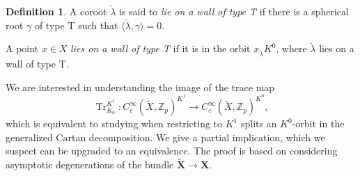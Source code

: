 \documentclass{amsart}
\theoremstyle{definition}
\newtheorem{definition}[theorem]{Definition}
\theoremstyle{remark}
\newcommand{\1}{\mathbf{1}}
\newcommand{\bra}{\langle}
\newcommand{\ket}{\rangle}
\newcommand{\mb}[1]{\mathbf{#1}}
\newcommand{\Z}{\mathbb{Z}}
\DeclareMathOperator{\Tr}{Tr}
\theoremstyle{definition}
\begin{document}
\begin{definition}
  A coroot $\check\lambda$ is said to \emph{lie on a wall of type T} if there is a spherical root $\gamma$ of type T such that $\bra\check{\lambda},\gamma\ket=0$.
  
  A point $x\in X$ \emph{lies on a wall of type T} if it is in the orbit $x_{\check\lambda} K^0$, where $\check\lambda$ lies on a wall of type T.
\end{definition}

We are interested in understanding the image of the trace map
\[
    \Tr_{K_0}^{K^1}:C_c^\infty(\widetilde{X},\Z_p)^{K^1}\to C_c^\infty(\widetilde{X},\Z_p)^{K^0},
\]
which is equivalent to studying when restricting to $K^1$ splits an $K^0$-orbit in the generalized Cartan decomposition. We give a partial implication, which we suspect can be upgraded to an equivalence. The proof is based on considering asymptotic degenerations of the bundle $\widetilde{\mb{X}}\to\mb{X}$.
\end{document}
